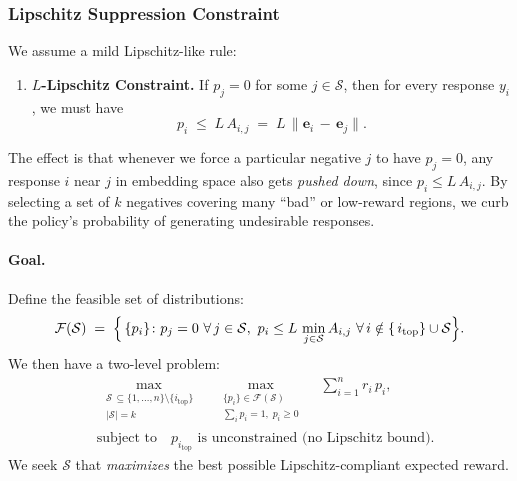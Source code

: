 \subsubsection{Lipschitz Suppression Constraint}
\label{subsec:LipschitzConstraintApp}

We assume a mild Lipschitz-like rule:
\begin{enumerate}[label=(A\arabic*), itemsep=0.5em]
    \item\label{asmp:Lipschitz} \textbf{\(L\)-Lipschitz Constraint.} If \(p_j = 0\) for some \(j\in \mathcal{S}\), then for every response \(y_i\), we must have
    \begin{equation}
    \label{eq:LipschitzConstraintApp}
    p_i 
    \;\le\; 
    L\, A_{i,j}
    \;=\;
    L\,\|\mathbf{e}_i \,-\,\mathbf{e}_j\|.
    \end{equation}
\end{enumerate}
The effect is that whenever we force a particular negative \(j\) to have \(p_j=0\), any response \(i\) near \(j\) in embedding space also gets \emph{pushed down}, since \(p_i \le L\,A_{i,j}\). By selecting a set of $k$ negatives covering many ``bad'' or low-reward regions, we curb the policy's probability of generating undesirable responses.

\paragraph{Goal.} 
Define the feasible set of distributions:
\begin{equation}
\label{eq:feasibleRegionApp}
\mathcal{F}(\mathcal{S}) 
\;=\; 
\Bigl\{\,
\{p_i\}\colon p_j=0 \ \forall\,j\in \mathcal{S}, \ 
p_i \le L\, \min_{j\in \mathcal{S}} A_{i,j}\ \forall\,i\notin\{\,i_{\mathrm{top}}\}\cup\mathcal{S}
\Bigr\}.
\end{equation}
We then have a two-level problem:
\begin{align}
\nonumber
&\max_{\,\substack{\mathcal{S}\,\subseteq \{1,\dots,n\}\setminus\{i_{\mathrm{top}}\}\\ |\mathcal{S}|=k}}  
\quad
\max_{\substack{\{p_i\}\in \mathcal{F}(\mathcal{S}) \\ \sum_i p_i = 1,\;p_i\ge 0}}
\quad
\sum_{i=1}^n r_i\, p_i,
\\[0.75em]
&\text{subject to}\quad p_{i_{\mathrm{top}}}\text{ is unconstrained (no Lipschitz bound).}
\label{eq:lip_mainObjApp}
\end{align}
We seek \(\mathcal{S}\) that \emph{maximizes} the best possible Lipschitz-compliant expected reward.

